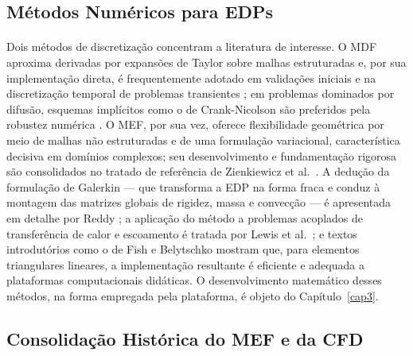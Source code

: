 \subsection{Métodos Numéricos para EDPs}
\paragraph{}Dois métodos de discretização concentram a literatura de interesse. O MDF aproxima derivadas por expansões de Taylor sobre malhas estruturadas e, por sua implementação direta, é frequentemente adotado em validações iniciais e na discretização temporal de problemas transientes \cite{Patankar1980}; em problemas dominados por difusão, esquemas implícitos como o de Crank-Nicolson são preferidos pela robustez numérica \cite{Versteeg2007}. O MEF, por sua vez, oferece flexibilidade geométrica por meio de malhas não estruturadas e de uma formulação variacional, característica decisiva em domínios complexos; seu desenvolvimento e fundamentação rigorosa são consolidados no tratado de referência de Zienkiewicz et al.\ \cite{Zienkiewicz2013}. A dedução da formulação de Galerkin --- que transforma a EDP na forma fraca e conduz à montagem das matrizes globais de rigidez, massa e convecção --- é apresentada em detalhe por Reddy \cite{Reddy2005}; a aplicação do método a problemas acoplados de transferência de calor e escoamento é tratada por Lewis et al.\ \cite{Lewis2004}; e textos introdutórios como o de Fish e Belytschko \cite{Fish2007} mostram que, para elementos triangulares lineares, a implementação resultante é eficiente e adequada a plataformas computacionais didáticas. O desenvolvimento matemático desses métodos, na forma empregada pela plataforma, é objeto do Capítulo~\ref{cap3}.

\subsection{Consolidação Histórica do MEF e da CFD}
